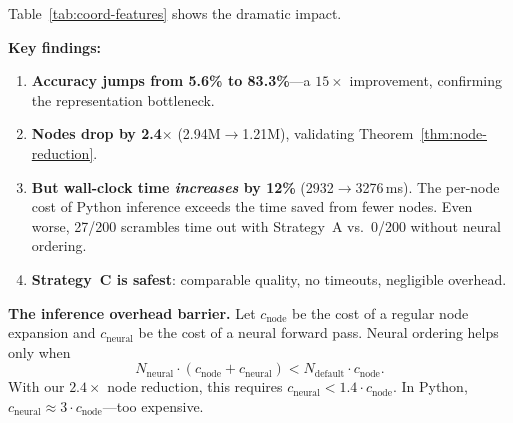 \documentclass[graybox]{svmult}
\begin{document}
Table~\ref{tab:coord-features} shows the dramatic impact.

\begin{table}[!t]
\centering
\caption{Coordinate features: accuracy and search impact (200 scrambles, $K{=}5$).}
\label{tab:coord-features}
\end{table}

\textbf{Key findings:}
\begin{enumerate}[leftmargin=*]
  \item \textbf{Accuracy jumps from 5.6\% to 83.3\%}---a $15\times$ improvement, confirming the representation bottleneck.
  \item \textbf{Nodes drop by 2.4$\times$} (2.94M$\to$1.21M), validating Theorem~\ref{thm:node-reduction}.
  \item \textbf{But wall-clock time \emph{increases} by 12\%} (2932$\to$3276\,ms). The per-node cost of Python inference exceeds the time saved from fewer nodes. Even worse, 27/200 scrambles time out with Strategy~A vs.\ 0/200 without neural ordering.
  \item \textbf{Strategy~C is safest}: comparable quality, no timeouts, negligible overhead.
\end{enumerate}

\textbf{The inference overhead barrier.} Let $c_{\text{node}}$ be the cost of a regular node expansion and $c_{\text{neural}}$ be the cost of a neural forward pass. Neural ordering helps only when
\begin{equation}
\label{eq:overhead}
N_{\text{neural}} \cdot (c_{\text{node}} + c_{\text{neural}}) < N_{\text{default}} \cdot c_{\text{node}}.
\end{equation}
With our $2.4\times$ node reduction, this requires $c_{\text{neural}} < 1.4 \cdot c_{\text{node}}$. In Python, $c_{\text{neural}} \approx 3 \cdot c_{\text{node}}$---too expensive.
\end{document}
